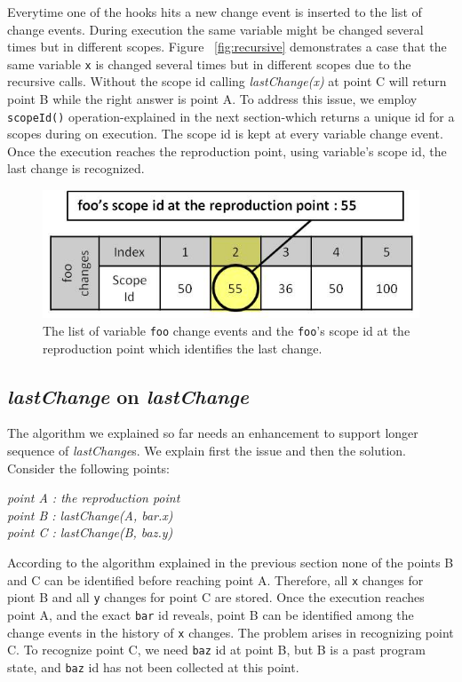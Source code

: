 \documentclass[preprint]{sigplanconf}
\begin{document}
Everytime one of the hooks hits a new change event is inserted to the list of change events. During execution the same variable might be changed several times but in different scopes. Figure ~\ref{fig:recursive} demonstrates a case that the same variable \texttt{x} is changed several times but in different scopes due to the recursive calls. Without the scope id calling \textit{lastChange(x)} at point C will return point B while the right answer is point A. To address this issue, we employ \texttt{scopeId()} operation-explained in the next section-which returns a unique id for a scopes during on execution. The scope id is kept at every variable change event. Once the execution reaches the reproduction point, using variable's scope id, the last change is recognized. 

\begin{figure}[htp]
\includegraphics[width=.48\textwidth]{7-foo-changes2.jpg}
\caption{The list of variable \texttt{foo} change events and the \texttt{foo}'s scope id at the reproduction point which identifies the last change.}
\label{fig:foo-changes2}
\end{figure}

 
\subsection{\textit{lastChange} on \textit{lastChange}}
The algorithm we explained so far needs an enhancement to support longer sequence of \textit{lastChange}s. We explain first the issue and then the solution. Consider the following points:

\begin{center}
\textit{
 point A : the reproduction point \\
 point B : lastChange(A, bar.x) \\
 point C : lastChange(B, baz.y) 
 }
 \end{center}
According to the algorithm explained in the previous section none of the points B and C can be identified before reaching point A. Therefore, all \texttt{x} changes for piont B and all \texttt{y} changes for point C are stored. Once the execution reaches point A, and the exact \texttt{bar} id reveals, point B can be identified among the change events in the history of \texttt{x} changes. The problem arises in recognizing point C. To recognize point C, we need \texttt{baz} id at point B, but B is a past program state, and \texttt{baz} id has not been collected at this point. 
\end{document}

